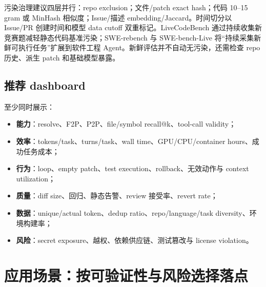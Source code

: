 \documentclass[10pt,a4paper,UTF8,fontset=none]{ctexart}
\begin{document}
污染治理建议四层并行：repo exclusion；文件/patch exact hash；代码 10--15 gram 或 MinHash 相似度；Issue/描述 embedding/Jaccard。时间切分以 Issue/PR 创建时间和模型 data cutoff 双重标记。LiveCodeBench 通过持续收集新竞赛题减轻静态代码基准污染\cite{zh:jain2024livecodebench}；SWE-rebench 与 SWE-bench-Live 将“持续采集新鲜可执行任务”扩展到软件工程 Agent\cite{zh:badertdinov2025swerebench,zh:microsoft2026swebenchlive}。新鲜评估并不自动无污染，还需检查 repo 历史、派生 patch 和基础模型暴露。

\subsection{推荐 dashboard}

至少同时展示：

\begin{itemize}
  \item \textbf{能力}：resolve、F2P、P2P、file/symbol recall@k、tool-call validity；
  \item \textbf{效率}：tokens/task、turns/task、wall time、GPU/CPU/container hours、成功任务成本；
  \item \textbf{行为}：loop、empty patch、test execution、rollback、无效动作与 context utilization；
  \item \textbf{质量}：diff size、回归、静态告警、review 接受率、revert rate；
  \item \textbf{数据}：unique/actual token、dedup ratio、repo/language/task diversity、环境构建率；
  \item \textbf{风险}：secret exposure、越权、依赖供应链、测试篡改与 license violation。
\end{itemize}

\section{应用场景：按可验证性与风险选择落点}
\end{document}
